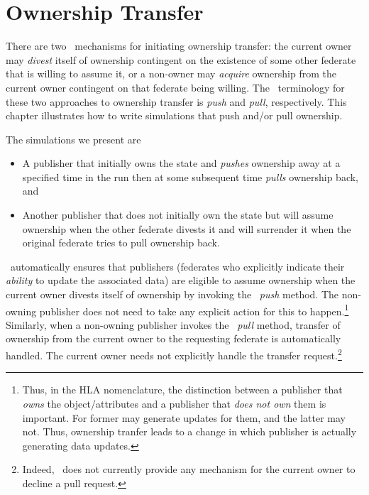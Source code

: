 \chapter{Ownership Transfer}
\label{sec:hla-own}

There are two \TrickHLA\ mechanisms for initiating ownership transfer:
the current owner may {\em divest} itself of ownership contingent on the
existence of some other federate that is willing to assume it,
or a non-owner may {\em acquire} ownership from the current owner
contingent on that federate being willing.
The \TrickHLA\ terminology for these two approaches to ownership  transfer
is {\em push} and {\em pull}, respectively.
This chapter illustrates how to write simulations that push and/or pull
ownership.

The simulations we present are
\begin{itemize}
\item{
  A publisher that initially owns the \simplesine state
  and {\em pushes} ownership away at a specified time in the run
  then at some subsequent time {\em pulls} ownership back, and
}
\item{
  Another publisher that does not initially own the \simplesine state
  but will assume ownership when the other federate divests it and will
  surrender it when the original federate tries to pull ownership back.
}
\end{itemize}

\TrickHLA\ automatically ensures that publishers
(federates who explicitly indicate their {\em ability}
to update the associated data)
are eligible to assume ownership when the current owner divests
itself of ownership by invoking the \TrickHLA\ {\em push} method.
The non-owning publisher does not need to take any explicit action
for this to happen.\footnote{
  Thus, in the HLA nomenclature, the distinction between a
  publisher that {\em owns} the object/attributes and a
  publisher that {\em does not own} them is important.
  For former may generate updates for them, and the latter may not.
  Thus, ownership tranfer leads to a change in which publisher
  is actually generating data updates.
}
Similarly, when a non-owning publisher invokes the
\TrickHLA\ {\em pull} method, transfer of ownership from the current owner
to the requesting federate is automatically handled.
The current owner needs not explicitly handle the transfer request.\footnote{
  Indeed, \TrickHLA\ does not currently provide any mechanism
  for the current owner to decline a pull request.
}

